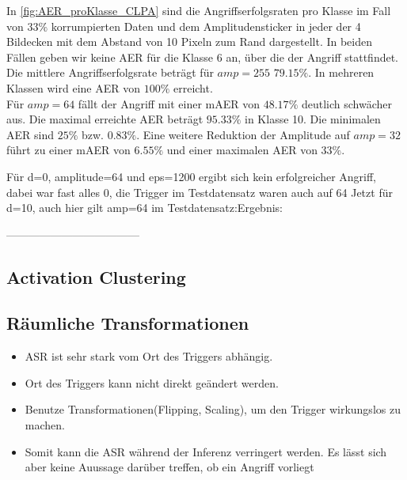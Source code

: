 \documentclass[11pt,a4paper]{article}
\numberwithin{equation}{section}
\begin{document}
	In \autoref{fig:AER_proKlasse_CLPA} sind die Angriffserfolgsraten pro Klasse im Fall von $33 \%$ korrumpierten Daten und dem Amplitudensticker in jeder der 4 Bildecken mit dem Abstand von 10 Pixeln zum Rand dargestellt. In beiden Fällen geben wir keine AER für die Klasse 6 an, über die der Angriff stattfindet.
	Die mittlere Angriffserfolgsrate beträgt für $amp=255$ $79.15 \%$. In mehreren Klassen wird eine AER von $100 \%$ erreicht.\\
	Für $amp=64$ fällt der Angriff mit einer mAER von $48.17 \%$ deutlich schwächer aus. Die maximal erreichte AER beträgt $95.33 \%$ in Klasse 10. Die minimalen AER sind $25 \%$ bzw. $0.83 \% $.
	Eine weitere Reduktion der Amplitude auf $amp=32$ führt zu einer mAER von $6.55 \%$ und einer maximalen AER von $33 \%$.
	
	Für d=0, amplitude=64 und eps=1200 ergibt sich kein erfolgreicher Angriff, dabei war fast alles 0, die Trigger im Testdatensatz waren auch auf 64
	Jetzt für d=10, auch hier gilt amp=64 im Testdatensatz:Ergebnis:
	
	
	------------------------------------
	\subsection{Activation Clustering}
	\subsection{Räumliche Transformationen}
	\begin{itemize}
		\item ASR ist sehr stark vom Ort des Triggers abhängig.
		\item Ort des Triggers kann nicht direkt geändert werden.
		\item Benutze Transformationen(Flipping, Scaling), um den Trigger wirkungslos zu machen.
		\item Somit kann die ASR während der Inferenz verringert werden. Es lässt sich aber keine Auussage darüber treffen, ob ein Angriff vorliegt
	\end{itemize}
	\newpage
\end{document}
